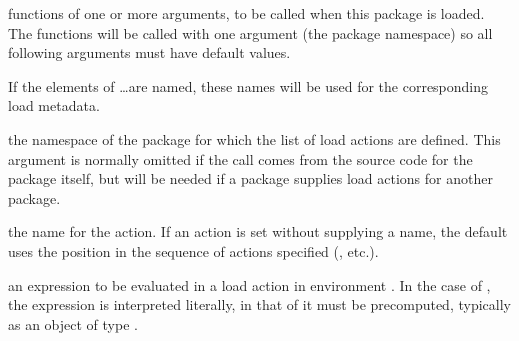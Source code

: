\begin{Arguments}
\begin{ldescription}

\item[\code{action, ...}] 
functions of one or more arguments, to be called when this package is
loaded. The functions will be called with one argument (the package
namespace) so all following arguments must have default values.

If the elements of \dots are named, these names will be used for the
corresponding load metadata.


\item[\code{where, .where}] 
the namespace of the package for which the list of load actions are
defined. This argument is
normally omitted if the call comes from the source code for the package itself, but will
be needed if a package supplies load actions for another package.


\item[\code{aname}] the name for the action.  If an action is set without
supplying a name,  the
default uses the position in the sequence of actions specified
(, etc.).


\item[\code{expr}] an expression to be evaluated in a load action in
environment .  In the case of ,
the expression is interpreted literally, in that of
 it must be precomputed, typically as an object
of type .

\end{ldescription}
\end{Arguments}
%
